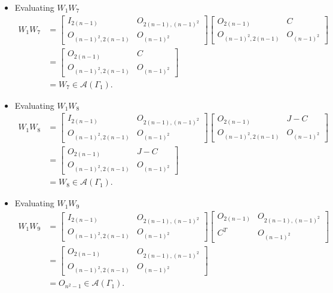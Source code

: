 \begin{itemize}
    \item Evaluating $W_1W_7$
    \begin{align*}
        W_1W_7
        &= \begin{bmatrix}
            I_{2(n-1)} & O_{2(n-1), (n-1)^2} \\
            O_{(n-1)^2, 2(n-1)} & O_{(n-1)^2}
        \end{bmatrix}\begin{bmatrix}
            O_{2(n-1)} & C \\
            O_{(n-1)^2, 2(n-1)} & O_{(n-1)^2}
        \end{bmatrix}\\
        &= \begin{bmatrix}
            O_{2(n-1)} & C \\
            O_{(n-1)^2, 2(n-1)} & O_{(n-1)^2}
        \end{bmatrix}\\
        &= W_7 \in \mathcal{A}(\Gamma_1).
    \end{align*}
    
    \item Evaluating $W_1W_8$
    \begin{align*}
        W_1W_8
        &= \begin{bmatrix}
            I_{2(n-1)} & O_{2(n-1), (n-1)^2} \\
            O_{(n-1)^2, 2(n-1)} & O_{(n-1)^2}
        \end{bmatrix}\begin{bmatrix}
            O_{2(n-1)} & J-C \\
            O_{(n-1)^2, 2(n-1)} & O_{(n-1)^2}
        \end{bmatrix}\\
        &= \begin{bmatrix}
            O_{2(n-1)} & J-C \\
            O_{(n-1)^2, 2(n-1)} & O_{(n-1)^2}
        \end{bmatrix}\\
        &= W_8 \in \mathcal{A}(\Gamma_1).
    \end{align*}
    
    \item Evaluating $W_1W_9$
    \begin{align*}
        W_1W_9
        &= \begin{bmatrix}
            I_{2(n-1)} & O_{2(n-1), (n-1)^2} \\
            O_{(n-1)^2, 2(n-1)} & O_{(n-1)^2}
        \end{bmatrix}\begin{bmatrix}
            O_{2(n-1)} & O_{2(n-1), (n-1)^2} \\
            C^T & O_{(n-1)^2}
        \end{bmatrix}\\
        &= \begin{bmatrix}
            O_{2(n-1)} & O_{2(n-1), (n-1)^2} \\
            O_{(n-1)^2, 2(n-1)} & O_{(n-1)^2}
        \end{bmatrix}\\
        &= O_{n^2-1} \in \mathcal{A}(\Gamma_1).
    \end{align*}
    

\end{itemize}
